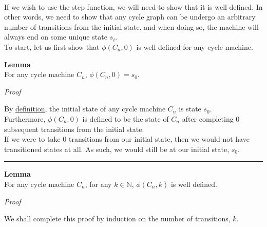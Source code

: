 \documentclass[a4paper,12pt]{article}
\begin{document}
\noindent \\
If we wish to use the step function, we will need to show that it is well defined. In other words, we need to show that any cycle graph can be undergo an arbitrary number of transitions from the initial state, and when doing so, the machine will always end on some unique state $s_i$.\\

\noindent To start, let us first show that $\phi(C_n, 0)$ is well defined for any cycle machine.\\







\label{lemma:phi_of_0}
\hypertarget{lemma:phi_of_0}{}
\begin{tcolorbox}
\textbf{Lemma}\\
For any cycle machine $C_n$, $\phi(C_n, 0) = s_0$.
\end{tcolorbox}

\noindent
\textit{Proof}

\noindent By \hyperlink{definition:cycle_machine}{definition}, the initial state of any cycle machine $C_n$ is state $s_0$.\\

\noindent Furthermore, $\phi(C_n, 0)$ is defined to be the state of $C_n$ after completing $0$ subsequent transitions from the initial state.\\

\noindent If we were to take $0$ transitions from our initial state, then we would not have transitioned states at all. As such, we would still be at our initial state, $s_0$.

\begin{center}
\noindent\rule{8cm}{0.4pt}
\end{center}









\label{lemma:phi_well_defined}
\hypertarget{lemma:phi_well_defined}{}
\begin{tcolorbox}
\textbf{Lemma}\\
For any cycle machine $C_n$, for any $k \in \mathbb{N}$, $\phi(C_n, k)$ is well defined.
\end{tcolorbox}

\noindent
\textit{Proof}

\noindent We shall complete this proof by induction on the number of transitions, $k$.\\
\end{document}
